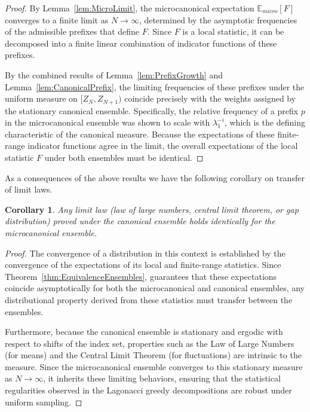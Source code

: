 \documentclass[11pt]{amsart}
\theoremstyle{plain}
\numberwithin{equation}{section} %
\newtheorem{corollary}[thm]{Corollary}
\numberwithin{table}{section} %
\numberwithin{figure}{section}
\begin{document}
	\begin{proof}
		By Lemma~\ref{lem:MicroLimit}, the microcanonical expectation $\mathbb{E}_{micro}[F]$ converges to a finite limit as $N \to \infty$, determined by the asymptotic frequencies of the admissible prefixes that define $F$. Since $F$ is a local statistic, it can be decomposed into a finite linear combination of indicator functions of these prefixes.
		
		By the combined results of 	Lemma~\ref{lem:PrefixGrowth} and Lemma~\ref{lem:CanonicalPrefix}, the limiting frequencies of these prefixes under the uniform measure on $[Z_N, Z_{N+1})$ coincide precisely with the weights assigned by the stationary canonical ensemble. Specifically, the relative frequency of a prefix $p$ in the microcanonical ensemble was shown to scale with $\lambda_1^{-i}$, which is the defining characteristic of the canonical measure. Because the expectations of these finite-range indicator functions agree in the limit, the overall expectations of the local statistic $F$ under both ensembles must be identical.
	\end{proof}
	
	
	As a consequences of the above results we have the following corollary on transfer of limit laws.
	
	\begin{corollary}
		\label{cor:Transfer}
		Any limit law (law of large numbers, central limit theorem, or gap distribution)
		proved under the canonical ensemble holds identically for the microcanonical
		ensemble.
	\end{corollary}
	
	\begin{proof}
		The convergence of a distribution in this context is established by the convergence of the expectations of its local and finite-range statistics. Since Theorem~\ref{thm:EquivalenceEnsembles}, guarantees that these expectations coincide asymptotically for both the microcanonical and canonical ensembles, any distributional property derived from these statistics must transfer between the ensembles.
		
		Furthermore, because the canonical ensemble is stationary and ergodic with respect to shifts of the index set, properties such as the Law of Large Numbers (for means) and the Central Limit Theorem (for fluctuations) are intrinsic to the measure. Since the microcanonical ensemble converges to this stationary measure as $N \to \infty$, it inherits these limiting behaviors, ensuring that the statistical regularities observed in the Lagonacci greedy decompositions are robust under uniform sampling.
	\end{proof}
	
\end{document}
